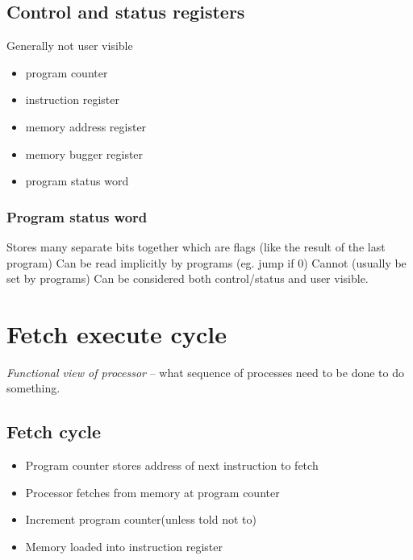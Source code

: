 \subsection{Control and status registers}\label{sub:control_and_status_registers}

Generally not user visible
\begin{itemize}
	\item program counter
	\item instruction register
	\item  memory address register
	\item memory bugger register
	\item program status word
\end{itemize}

\subsubsection{Program status word}\label{ssub:program_status_word}

Stores many separate bits together which are flags (like the result of the last program)
Can be read implicitly by programs (eg. jump if \(0\))
Cannot (usually be set by programs)
Can be considered both control/status and user visible.

\section{Fetch execute cycle}\label{sec:fetch_execute_cycle}

\emph{Functional view of processor} -- what sequence of processes need to be done to do something.

\subsection{Fetch cycle}\label{sub:fetch_cycle}

\begin{itemize}
	\item Program counter stores address of next instruction to fetch
	\item Processor fetches from memory at program counter
	\item Increment program counter(unless told not to)
	\item Memory loaded into instruction register
\end{itemize}
